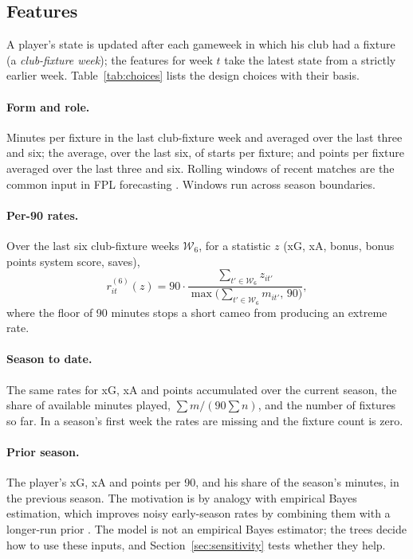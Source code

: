 \documentclass[11pt,a4paper]{article}
\begin{document}
\subsection{Features}
A player's state is updated after each gameweek in which his club had a fixture (a
\emph{club-fixture week}); the features for week $t$ take the latest state from a strictly earlier
week. Table~\ref{tab:choices} lists the design choices with their basis.

\paragraph{Form and role.} Minutes per fixture in the last club-fixture week and averaged over the
last three and six; the average, over the last six, of starts per fixture; and points per fixture
averaged over the last three and six. Rolling windows of recent matches are the common input in
FPL forecasting \citep{lombu2024,frees2024,ramezani2025}. Windows run across season boundaries.

\paragraph{Per-90 rates.} Over the last six club-fixture weeks $\mathcal{W}_6$, for a statistic
$z$ (xG, xA, bonus, bonus points system score, saves),
\[
  r^{(6)}_{it}(z) = 90 \cdot \frac{\sum_{t'\in\mathcal{W}_6} z_{it'}}{\max\!\bigl(\sum_{t'\in\mathcal{W}_6} m_{it'},\,90\bigr)},
\]
where the floor of 90 minutes stops a short cameo from producing an extreme rate.

\paragraph{Season to date.} The same rates for xG, xA and points accumulated over the current
season, the share of available minutes played, $\sum m / (90\sum n)$, and the number of fixtures
so far. In a season's first week the rates are missing and the fixture count is zero.

\paragraph{Prior season.} The player's xG, xA and points per 90, and his share of the season's
minutes, in the previous season. The motivation is by analogy with empirical Bayes estimation,
which improves noisy early-season rates by combining them with a longer-run prior
\citep{efronmorris1975,brown2008}. The model is not an empirical Bayes estimator; the trees decide
how to use these inputs, and Section~\ref{sec:sensitivity} tests whether they help.
\end{document}
